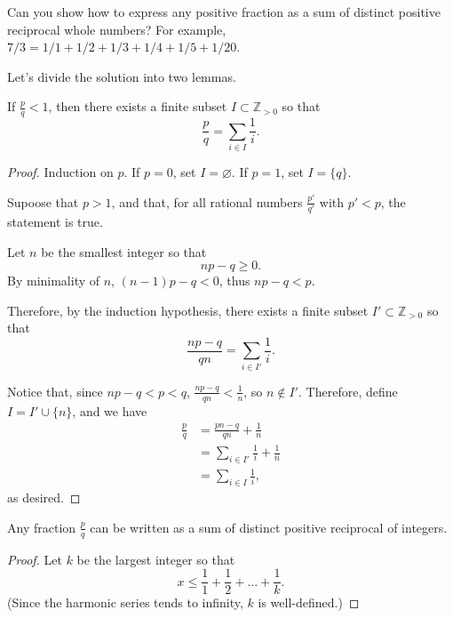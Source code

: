
\begin{prob}{}{}
	Can you show how to express any positive fraction as a sum of distinct positive reciprocal whole numbers? For example, \(7/3 = 1/1 + 1/2 + 1/3 + 1/4 + 1/5 + 1/20\).
\end{prob}

\begin{sol}{}{}
	Let's divide the solution into two lemmas.

	\begin{lem*}{}{}
		If \(\frac{p}{q} < 1\), then there exists a finite subset \(I \subset \mathbb{Z}_{>0}\) so that \[
			\frac{p}{q} = \sum_{i \in I} \frac{1}{i}.
		\]
	\end{lem*}

	\begin{proof}
		Induction on \(p\). If \(p = 0\), set \(I = \varnothing\). If \(p = 1\), set \(I = \{q\}\).

		Supoose that \(p > 1\), and that, for all rational numbers \(\frac{p'}{q'}\) with  \(p' < p\), the statement is true. 

		Let \(n\) be the smallest integer so that \[
			np - q \geq 0.
		\]
		By minimality of \(n\), \((n-1)p - q < 0\), thus  \(np - q < p\).

		Therefore, by the induction hypothesis, there exists a finite subset \(I' \subset \mathbb{Z}_{>0}\) so that \[
			\frac{np - q}{qn} = \sum_{i \in I'} \frac{1}{i}.
		\]

		Notice that, since \(np - q < p < q\), \(\frac{np - q}{qn} < \frac{1}{n}\), so \(n \notin I'\). Therefore, define \(I = I' \cup \{n\}\), and we have
		\begin{align*}
			\frac{p}{q} &= \frac{pn - q}{qn} + \frac{1}{n} \\
						&= \sum_{i \in I'}\frac{1}{i} + \frac{1}{n} \\
						&= \sum_{i \in I}\frac{1}{i},
		\end{align*}
		as desired.
	\end{proof}

	\begin{lem*}{}{}
		Any fraction \(\frac{p}{q}\) can be written as a sum of distinct positive reciprocal of integers.
	\end{lem*}

	\begin{proof}
		Let \(k\) be the largest integer so that \[
			x \leq \frac{1}{1} + \frac{1}{2} + \dots + \frac{1}{k}.
		\] (Since the harmonic series tends to infinity, \(k\) is well-defined.)


\end{proof}
\end{sol}
